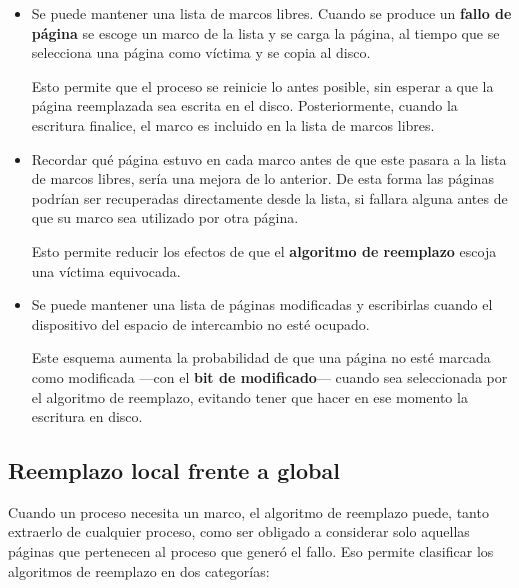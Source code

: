 \begin{itemize}
\item
  Se puede mantener una lista de marcos libres. Cuando se produce un
  \textbf{fallo de página} se escoge un marco de la lista y se carga la
  página, al tiempo que se selecciona una página como víctima y se copia
  al disco.

  Esto permite que el proceso se reinicie lo antes posible, sin esperar
  a que la página reemplazada sea escrita en el disco. Posteriormente,
  cuando la escritura finalice, el marco es incluido en la lista de
  marcos libres.
\item
  Recordar qué página estuvo en cada marco antes de que este pasara a la
  lista de marcos libres, sería una mejora de lo anterior. De esta forma
  las páginas podrían ser recuperadas directamente desde la lista, si
  fallara alguna antes de que su marco sea utilizado por otra página.

  Esto permite reducir los efectos de que el \textbf{algoritmo de
  reemplazo} escoja una víctima equivocada.
\item
  Se puede mantener una lista de páginas modificadas y escribirlas
  cuando el dispositivo del espacio de intercambio no esté ocupado.

  Este esquema aumenta la probabilidad de que una página no esté marcada
  como modificada ---con el \textbf{bit de modificado}--- cuando sea
  seleccionada por el algoritmo de reemplazo, evitando tener que hacer
  en ese momento la escritura en disco.
\end{itemize}

\subsection{Reemplazo local frente a
global}\label{_reemplazo_local_frente_a_global}

Cuando un proceso necesita un marco, el algoritmo de reemplazo puede,
tanto extraerlo de cualquier proceso, como ser obligado a considerar
solo aquellas páginas que pertenecen al proceso que generó el fallo. Eso
permite clasificar los algoritmos de reemplazo en dos categorías:

